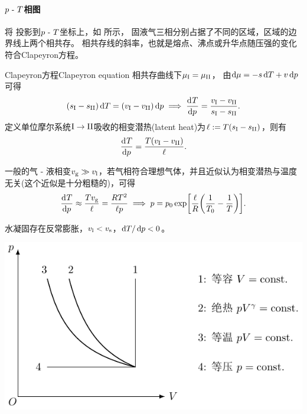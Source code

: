 \paragraph{$p~\text{-}~ T$相图}

将 投影到$p~\text{-}~ T$坐标上，如 所示，
固液气三相分别占据了不同的区域，区域的边界线上两个相共存。
相共存线的斜率，也就是熔点、沸点或升华点随压强的变化符合Clapeyron方程。

\begin{theorem}
	{Clapeyron方程}{Clapeyron equation}
	相共存曲线下$\mu_{\mathrm{I}}=\mu_{\mathrm{II}}$，
	由$\mathop{}\!\mathrm{d}\mu=-s\mathop{}\!\mathrm{d} T+v\mathop{}\!\mathrm{d} p$可得
	\[
		(s_{\mathrm{I}}-s_{\mathrm{II}})\mathop{}\!\mathrm{d} T=(v_{\mathrm{I}}-v_{\mathrm{II}})\mathop{}\!\mathrm{d} p\implies\frac{\mathrm{d}^{{}}T}{\mathrm{d}{p}^{{}}}=\frac{v_{\mathrm{I}}-v_{\mathrm{II}}}{s_{\mathrm{I}}-s_{\mathrm{II}}}.
	\]
	定义单位摩尔系统$\mathrm{I}\to\mathrm{II}$吸收的相变潜热(latent heat)为$\ell:=T(s_{\mathrm{I}}-s_{\mathrm{II}})$，则有
	\begin{equation}
		\frac{\mathrm{d}^{{}}T}{\mathrm{d}{p}^{{}}}=\frac{T(v_{\mathrm{I}}-v_{\mathrm{II}})}\ell.
	\end{equation}
\end{theorem}

\begin{corollary}
	一般的气 - 液相变$v_{\mathrm{g}}\gg v_{\mathrm{l}}$，若气相符合理想气体，并且近似认为相变潜热与温度无关(这个近似是十分粗糙的)，可得 
	\[
		\frac{\mathrm{d}^{{}}T}{\mathrm{d}{p}^{{}}}\approx\frac{Tv_{\mathrm{g}}}\ell=\frac{RT^2}{\ell p}\implies p=p_0\exp\biggl[\frac\ell{R}\biggl(\frac1{T_0}-\frac1T\biggr)\biggr].
	\]
	
\end{corollary}

\begin{remark}
	水凝固存在反常膨胀，$v_{\mathrm{l}}<v_{\mathrm{s}}$，$\mathop{}\!\mathrm{d} T/\mathop{}\!\mathrm{d} p<0$。
\end{remark}

\begin{center}
	\includegraphics[page=9]{figures/tikz/coordinates.pdf}
	\label{fig:H2O phase P-T}
\end{center}

